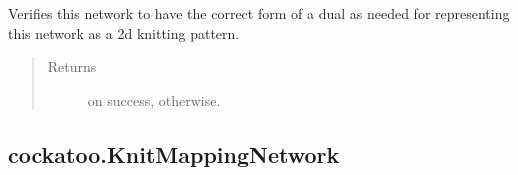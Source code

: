 \documentclass[letterpaper,10pt,english]{sphinxmanual}
\begin{document}
\begin{fulllineitems}
\begin{fulllineitems}
\begin{quote}
\begin{description}
\end{description}\end{quote}

\end{fulllineitems}


\begin{fulllineitems}
\label{\detokenize{cockatoo:cockatoo.KnitDiNetwork.verify_dual_form}}
Verifies this network to have the correct form of a dual as needed for
representing this network as a 2d knitting pattern.
\begin{quote}\begin{description}
\item[{Returns}] \leavevmode
{} \textendash{}  on success,  otherwise.

\end{description}\end{quote}

\end{fulllineitems}


\end{fulllineitems}



\subsection{cockatoo.KnitMappingNetwork}
\label{\detokenize{cockatoo:cockatoo-knitmappingnetwork}}
\end{document}
